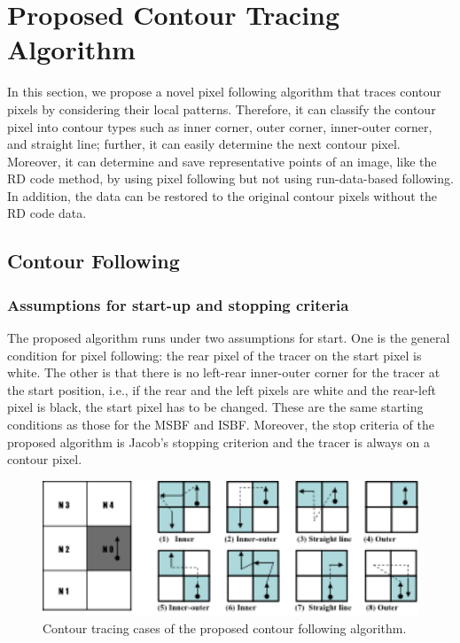 
\section{Proposed Contour Tracing Algorithm}

In this section, we propose a novel pixel following algorithm that traces contour pixels by considering their local patterns. Therefore, it can classify the contour pixel into contour types such as inner corner, outer corner, inner-outer corner, and straight line; further, it can easily determine the next contour pixel. Moreover, it can determine and save representative points of an image, like the RD code method, by using pixel following but not using run-data-based following. In addition, the data can be restored to the original contour pixels without the RD code data.

\subsection{Contour Following}

\subsubsection{Assumptions for start-up and stopping criteria}
The proposed algorithm runs under two assumptions for start. One is the general condition for pixel following: the rear pixel of the tracer on the start pixel is white. The other is that there is no left-rear inner-outer corner for the tracer at the start position, i.e., if the rear and the left pixels are white and the rear-left pixel is black, the start pixel has to be changed. These are the same starting conditions as those for the MSBF and ISBF. Moreover, the stop criteria of the proposed algorithm is Jacob's stopping criterion and the tracer is always on a contour pixel.

\begin{figure}[htbp]
	\centering
	\includegraphics[width=1.0\textwidth]{4.Proposed/proposed_cases.png}
	\caption{Contour tracing cases of the proposed contour following algorithm.}
	\label{fig:proposed_cases}
\end{figure}


